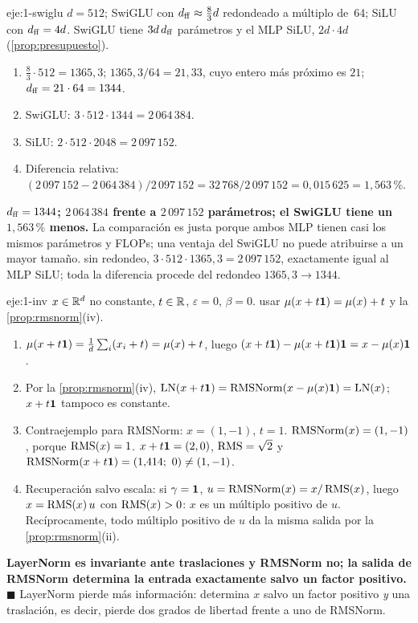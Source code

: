 \begin{solucion}{eje:1-swiglu}
\datos $d=512$; SwiGLU con $d_{\mathrm{ff}}\approx\frac83d$ redondeado a múltiplo de~64; SiLU con $d_{\mathrm{ff}}=4d$.
\planteamiento SwiGLU tiene $3d\,d_{\mathrm{ff}}$ parámetros y el MLP SiLU, $2d\cdot 4d$ (\cref{prop:presupuesto}).
\pasos
\begin{enumerate}[label=\arabic*.]
  \item $\frac83\cdot 512=1365{,}3$; $1365{,}3/64=21{,}33$, cuyo entero más próximo es $21$; $d_{\mathrm{ff}}=21\cdot 64=1344$.
  \item SwiGLU: $3\cdot 512\cdot 1344=2\,064\,384$.
  \item SiLU: $2\cdot 512\cdot 2048=2\,097\,152$.
  \item Diferencia relativa: $(2\,097\,152-2\,064\,384)/2\,097\,152=32\,768/2\,097\,152=0{,}015\,625=1{,}563\,\%$.
\end{enumerate}
\resultado \textbf{$d_{\mathrm{ff}}=1344$; $2\,064\,384$ frente a $2\,097\,152$ parámetros; el SwiGLU tiene un $1{,}563\,\%$ menos.} La comparación es justa porque ambos MLP tienen casi los mismos parámetros y FLOPs; una ventaja del SwiGLU no puede atribuirse a un mayor tamaño.
\comprobacion sin redondeo, $3\cdot 512\cdot 1365{,}3=2\,097\,152$, exactamente igual al MLP SiLU; toda la diferencia procede del redondeo $1365{,}3\to 1344$.
\end{solucion}

\begin{solucion}{eje:1-inv}
\datos $x\in\mathbb{R}^{d}$ no constante, $t\in\mathbb{R}$, $\varepsilon=0$, $\beta=0$.
\planteamiento usar $\mu(x+t\mathbf{1})=\mu(x)+t$ y la \cref{prop:rmsnorm}(iv).
\pasos
\begin{enumerate}[label=\arabic*.]
  \item $\mu(x+t\mathbf{1})=\frac1d\sum_i(x_i+t)=\mu(x)+t$, luego $(x+t\mathbf{1})-\mu(x+t\mathbf{1})\mathbf{1}=x-\mu(x)\mathbf{1}$.
  \item Por la \cref{prop:rmsnorm}(iv), $\operatorname{LN}(x+t\mathbf{1})=\operatorname{RMSNorm}(x-\mu(x)\mathbf{1})=\operatorname{LN}(x)$; $x+t\mathbf{1}$ tampoco es constante.
  \item Contraejemplo para RMSNorm: $x=(1,-1)$, $t=1$. $\operatorname{RMSNorm}(x)=(1,-1)$, porque $\operatorname{RMS}(x)=1$. $x+t\mathbf{1}=(2,0)$, $\operatorname{RMS}=\sqrt2$ y $\RMSNorm(x+t\uno)=(1{,}414;\ 0)\ne(1,-1)$.
  \item Recuperación salvo escala: si $\gamma=\mathbf{1}$, $u=\operatorname{RMSNorm}(x)=x/\operatorname{RMS}(x)$, luego $x=\operatorname{RMS}(x)\,u$ con $\operatorname{RMS}(x)>0$: $x$ es un múltiplo positivo de $u$. Recíprocamente, todo múltiplo positivo de $u$ da la misma salida por la \cref{prop:rmsnorm}(ii).
\end{enumerate}
\resultado \textbf{LayerNorm es invariante ante traslaciones y RMSNorm no; la salida de RMSNorm determina la entrada exactamente salvo un factor positivo.} $\blacksquare$
\comprobacion LayerNorm pierde más información: determina $x$ salvo un factor positivo \emph{y} una traslación, es decir, pierde dos grados de libertad frente a uno de RMSNorm.
\end{solucion}

